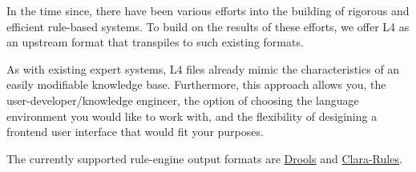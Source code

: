 In the time since, there have been various efforts into the building of rigorous 
and efficient rule-based systems.
To build on the results of these efforts, we offer L4 as an upstream format that 
transpiles to such existing formats. 

As with existing expert systems, L4 files already mimic the characteristics 
of an easily modifiable knowledge base. 
Furthermore, this approach allows you, the user-developer/knowledge engineer, 
the option of choosing the language environment you would like to work with, and the 
flexibility of desigining a frontend user interface that would fit your purposes.

The currently supported rule-engine output formats are 
\href{https://docs.jboss.org/drools/release/7.58.0.Final/drools-docs/html_single/}{Drools} 
and 
\href{http://www.clara-rules.org/}{Clara-Rules}.



